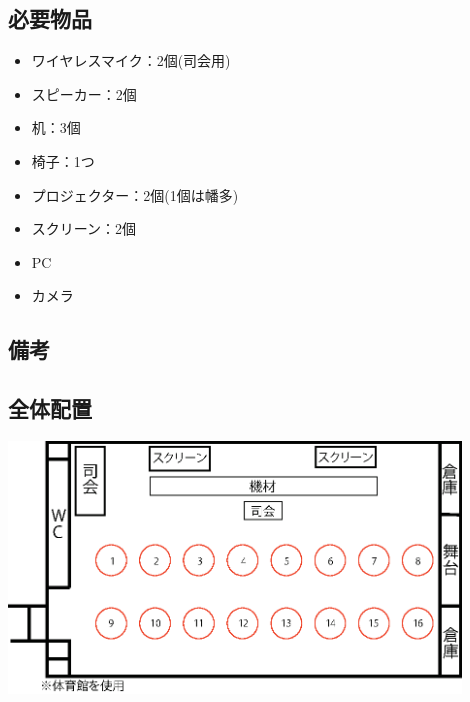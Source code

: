 \newpage

\subsection{必要物品}
\begin{itemize}
  \item ワイヤレスマイク：2個(司会用)
  \item スピーカー：2個
  \item 机：3個
  \item 椅子：1つ
  \item プロジェクター：2個(1個は幡多)
  \item スクリーン：2個
  \item PC
  \item カメラ

\end{itemize}
\subsection{備考}

\subsection{全体配置}
\begin{center}
\includegraphics[width=12cm]{./21/reiout1.eps}
\label{fig:ice}

\end{center}
